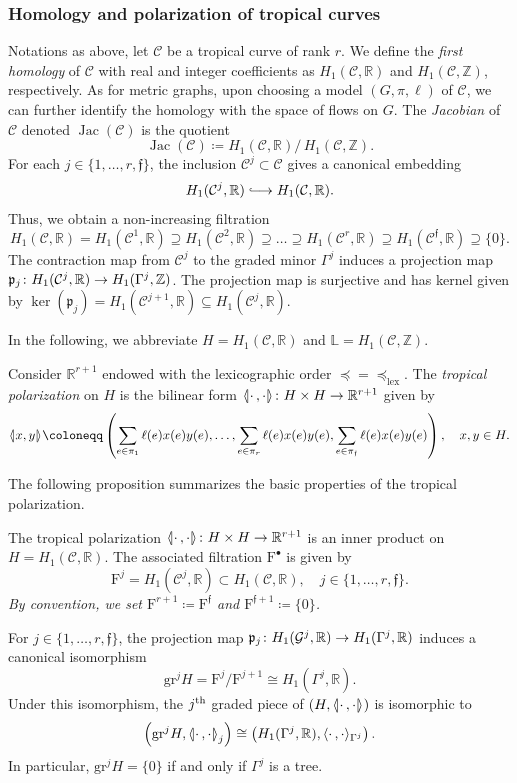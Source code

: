\documentclass[AHL,Unicode,longabstracts]{cedram}
\newcommand{\innone}[2]{{\langle#2\rangle_{#1}}}
\newcommand{\llangle}{\mathopen{\langle\mkern -3.1mu\lvert}}
\newcommand{\rrangle}{\mathclose{\rvert\mkern -3.1mu\rangle}}
\newcommand{\highinn}[2]{{\llangle#2\rrangle_{#1}}}
\newcommand{\rquot}[2]{#1/\,#2}
\DeclareMathOperator{\Jac}{Jac}
\newcommand{\filter}{\mathrm{F}}
\newcommand{\R}{\mathbb{R}}
\newcommand{\Z}{\mathbb{Z}}
\renewcommand{\L}{\mathbb{L}}
\newcommand{\mgr}{\mathcal{G}}
\newcommand{\curve}{\mathcal{C}}
\newcommand{\grm}[2]{\mathrm{gr}_{#1}^{#2}}
\newcommand{\proj}{\mathfrak{p}}
\newcommand{\fin}{\mathfrak f}
\newcommand{\lexeq}{\preceq_{\mathrm{lex}}}
\renewcommand*{\to}{\mathchoice{\longrightarrow}{\rightarrow}{\rightarrow}{\rightarrow}}
\newcommand{\longhookrightarrow}{\lhook\joinrel\longrightarrow}
\newcommand*{\hookto}{\mathchoice{\longhookrightarrow}{\hookrightarrow}{\hookrightarrow}{\hookrightarrow}}
\begin{document}
\subsubsection{Homology and polarization of tropical curves}
\label{ss:tropical_polarization}
Notations as above, let $\curve$ be a tropical curve of rank $r$. We define the \emph{first homology} of $\curve$ with real and integer coefficients as $H_1(\curve, \R)$ and $H_1(\curve, \Z)$, respectively. As for metric graphs, upon choosing a model $(G, \pi, \ell)$ of $\curve$, we can further identify the homology with the space of flows on $G$. The \emph{Jacobian} of $\curve$ denoted $\Jac(\curve)$ is the quotient
\[
\Jac(\curve) \coloneqq \rquot{ H_1(\curve, \R)}{H_1(\curve, \Z)}.
\]
For each $j \in \{1, \dots, r, \fin \}$, the inclusion $\curve^j \subset \curve$ gives a canonical embedding
\[
H_1(\curve^j, \R) \hookto H_1(\curve, \R).
\]
Thus, we obtain a non-increasing filtration
\[
H_1(\curve, \R) = H_1(\curve^1, \R) \supseteq H_1(\curve^2, \R) \supseteq \dots \supseteq H_1(\curve^r, \R) \supseteq H_1(\curve^\fin, \R) \supseteq \{0\}.
\]
The contraction map from $\curve^j$ to the graded minor $\Gamma^j$ induces a projection map $\proj_j \colon H_1(\curve^j, \R) \to H_1(\Gamma^j, \Z)$. The projection map is surjective and has kernel given by $\ker(\proj_j) = H_1(\curve^{j+1}, \R) \subseteq H_1(\curve^j, \R)$.


In the following, we abbreviate $H= H_1(\curve, \R)$ and $\L=H_1(\curve, \Z)$.

\begin{defi}
Consider $\R^{r+1}$ endowed with the lexicographic order $\preceq=\lexeq$. The \emph{tropical polarization} on $H$ is the bilinear form $\highinn{}{\cdot\,,\cdot} \colon H \times H \to \R^{r+1}$ given by
\[
\highinn{}{x,y} \coloneqq \left(\sum_{e\in \pi_1} \ell(e)x(e)y(e), \dots, \sum_{e\in \pi_r} \ell(e)x(e)y(e), \sum_{e\in \pi_\fin} \ell(e)x(e)y(e)\right), \quad x,y \in H.%
\]
\end{defi}


The following proposition summarizes the basic properties of the tropical polarization.

\begin{prop}
The tropical polarization $\highinn{}{\cdot\,,\cdot} \colon H \times H \to \R^{r+1}$ is an inner product on $H= H_1(\curve, \R)$. The associated filtration $\filter^\bullet$ is given by
\[
\filter^j = H_1(\curve^j, \R) \subset H_1(\curve, \R), \quad j \in \{1, \dots, r, \fin \}.
\]
\emph{By convention, we set $\filter^{r+1} \coloneqq \filter^\fin$ and $\filter^{\fin +1} \coloneqq \{0\}$.}


\noindent For $j \in \{1, \dots, r, \fin\}$, the projection map $\proj_j \colon H_1(\mgr^j, \R) \to H_1(\Gamma^j, \R)$ induces a canonical isomorphism
\[
\grm{}{j} H = \filter^j / \filter^{j+1} \cong H_1\left(\Gamma^j, \R\right).
\]
Under this isomorphism, the $j^{\rm th}$ graded piece of $(H,\highinn{}{\cdot\,,\cdot})$ is isomorphic to
\[
\left(\grm{}{j} H, \highinn{j}{\cdot \,, \cdot} \right) \cong \left(H_1(\Gamma^j,\R), \innone{\Gamma^j}{\cdot \,, \cdot} \right).
\]
In particular, $\grm{}{j} H = \{0\}$ if and only if $\Gamma^j$ is a tree.
\end{prop}
\end{document}
